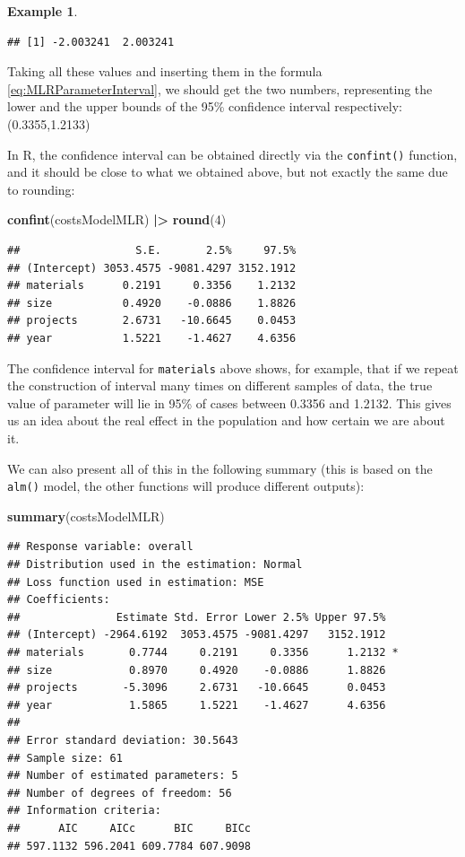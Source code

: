 \documentclass[
]{book}
\newenvironment{Shaded}{\begin{snugshade}}{\end{snugshade}}
\newcommand{\DecValTok}[1]{\textcolor[rgb]{0.00,0.00,0.81}{#1}}
\newcommand{\FunctionTok}[1]{\textcolor[rgb]{0.13,0.29,0.53}{\textbf{#1}}}
\newcommand{\NormalTok}[1]{#1}
\newcommand{\SpecialCharTok}[1]{\textcolor[rgb]{0.81,0.36,0.00}{\textbf{#1}}}
\theoremstyle{definition}
\theoremstyle{definition}
\newtheorem{example}{Example}[chapter]
\theoremstyle{definition}
\theoremstyle{definition}
\theoremstyle{remark}
\begin{document}
\begin{example}
\begin{verbatim}
## [1] -2.003241  2.003241
\end{verbatim}

Taking all these values and inserting them in the formula \eqref{eq:MLRParameterInterval}, we should get the two numbers, representing the lower and the upper bounds of the 95\% confidence interval respectively: (0.3355,1.2133)

In R, the confidence interval can be obtained directly via the \texttt{confint()} function, and it should be close to what we obtained above, but not exactly the same due to rounding:

\begin{Shaded}
\begin{Highlighting}[]
\FunctionTok{confint}\NormalTok{(costsModelMLR) }\SpecialCharTok{|\textgreater{}} \FunctionTok{round}\NormalTok{(}\DecValTok{4}\NormalTok{)}
\end{Highlighting}
\end{Shaded}

\begin{verbatim}
##                  S.E.       2.5%     97.5%
## (Intercept) 3053.4575 -9081.4297 3152.1912
## materials      0.2191     0.3356    1.2132
## size           0.4920    -0.0886    1.8826
## projects       2.6731   -10.6645    0.0453
## year           1.5221    -1.4627    4.6356
\end{verbatim}

The confidence interval for \texttt{materials} above shows, for example, that if we repeat the construction of interval many times on different samples of data, the true value of parameter will lie in 95\% of cases between 0.3356 and 1.2132. This gives us an idea about the real effect in the population and how certain we are about it.
\end{example}

We can also present all of this in the following summary (this is based on the \texttt{alm()} model, the other functions will produce different outputs):

\begin{Shaded}
\begin{Highlighting}[]
\FunctionTok{summary}\NormalTok{(costsModelMLR)}
\end{Highlighting}
\end{Shaded}

\begin{verbatim}
## Response variable: overall
## Distribution used in the estimation: Normal
## Loss function used in estimation: MSE
## Coefficients:
##               Estimate Std. Error Lower 2.5% Upper 97.5%  
## (Intercept) -2964.6192  3053.4575 -9081.4297   3152.1912  
## materials       0.7744     0.2191     0.3356      1.2132 *
## size            0.8970     0.4920    -0.0886      1.8826  
## projects       -5.3096     2.6731   -10.6645      0.0453  
## year            1.5865     1.5221    -1.4627      4.6356  
## 
## Error standard deviation: 30.5643
## Sample size: 61
## Number of estimated parameters: 5
## Number of degrees of freedom: 56
## Information criteria:
##      AIC     AICc      BIC     BICc 
## 597.1132 596.2041 609.7784 607.9098
\end{verbatim}
\end{document}
